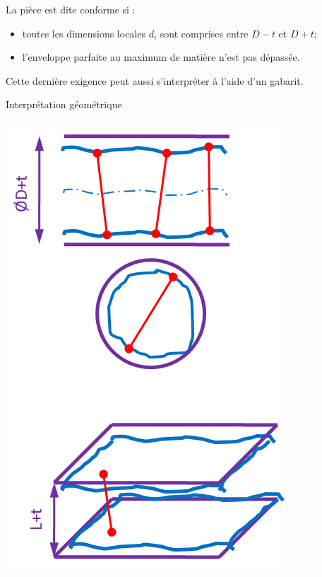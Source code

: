 \documentclass[11pt,oneside]{article}
\begin{document}
\begin{resultat}
\begin{minipage}[t]{.3\linewidth}
La pièce est dite conforme si :
\begin{itemize}
\item toutes les dimensions locales $d_i$ sont comprises entre $D-t$ et $D+t$;
\item l'enveloppe parfaite au maximum de matière n'est pas dépassée.
\end{itemize}

Cette dernière exigence peut aussi s'interpréter à l'aide d'un gabarit.
\end{minipage} \hfill
\begin{minipage}[t]{.3\linewidth}
\begin{center}
Interprétation géométrique

\includegraphics[width=.95\textwidth]{png/linE_int}
\end{center}
\end{minipage}
\end{resultat}
\end{document}
